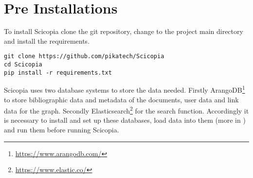 \section{Pre Installations}
To install Scicopia clone the git repository, change to the project main directory and install the requirements. 
\begin{verbatim}
git clone https://github.com/pikatech/Scicopia
cd Scicopia
pip install -r requirements.txt
\end{verbatim}
Scicopia uses two database systems to store the data needed. Firstly ArangoDB\footnote{\url{https://www.arangodb.com/}} to store bibliographic data and metadata of the documents, user data and link data for the graph. Secondly Elasticsearch\footnote{\url{https://www.elastic.co/}} for the search function. Accordingly it is necessary to install and set up these databases, load data into them (more in ) and run them before running Scicopia.